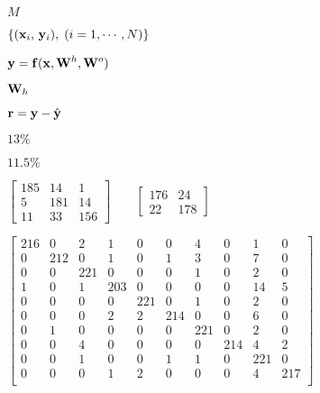 \documentclass{article}
\def\lthtmlcheckvsize{\ifdim\ht\sizebox<\vsize 
  \ifdim\wd\sizebox<\hsize\expandafter\hfill\fi \expandafter\vfill
  \else\expandafter\vss\fi}%
\begin{document}
{\newpage\clearpage
{}%
$ M$%
\lthtmlindisplaymathZ
\lthtmlcheckvsize\clearpage}

{\newpage\clearpage
{}%
$ \{({\bf x}_i,\,{\bf y}_i),\;(i=1,\cdots,N)\}$%
\lthtmlindisplaymathZ
\lthtmlcheckvsize\clearpage}

{\newpage\clearpage
{}%
$\displaystyle {\bf y}={\bf f}({\bf x},{\bf W}^h,{\bf W}^o)$%
\lthtmlindisplaymathZ
\lthtmlcheckvsize\clearpage}

{\newpage\clearpage
{}%
$ {\bf W}_h$%
\lthtmlindisplaymathZ
\lthtmlcheckvsize\clearpage}

{\newpage\clearpage
{}%
$ {\bf r}={\bf y}-\hat{\bf y}$%
\lthtmlindisplaymathZ
\lthtmlcheckvsize\clearpage}

{\newpage\clearpage
{}%
$ 13\%$%
\lthtmlindisplaymathZ
\lthtmlcheckvsize\clearpage}

{\newpage\clearpage
{}%
$ 11.5\%$%
\lthtmlindisplaymathZ
\lthtmlcheckvsize\clearpage}

{\newpage\clearpage
{}%
$\displaystyle \left[ \begin{array}{rrr}
185 & 14 &  1 \\5 & 181 & 14 \\11 & 33 &156
\end{array}\right]
\;\;\;\;\;\;\;
\left[ \begin{array}{rr}176 & 24 \\22 & 178 \end{array}\right]$%
\lthtmlindisplaymathZ
\lthtmlcheckvsize\clearpage}

{\newpage\clearpage
{}%
$\displaystyle \left[ \begin{array}{rrrrrrrrrr}
216 & 0 & 2 & 1 & 0 & 0 & 4 & 0 & 1 &  0 \\
0 & 212 & 0 & 1 & 0 & 1 & 3 & 0 & 7 & 0 \\
0 & 0 & 221 & 0 & 0 & 0 & 1 & 0 & 2 & 0 \\
1 & 0 & 1 & 203 & 0 & 0 & 0 & 0 & 14& 5 \\
0 & 0 & 0 & 0 & 221 & 0 & 1 & 0 & 2 & 0 \\
0 & 0 & 0 & 2 & 2 & 214 & 0 & 0 & 6 & 0 \\
0 & 1 & 0 & 0 & 0 & 0 & 221 & 0 & 2 & 0 \\
0 & 0 & 4 & 0 & 0 & 0 & 0 & 214 & 4 & 2 \\
0 & 0 & 1 & 0 & 0 & 1 & 1 & 0 & 221 & 0 \\
0 & 0 & 0 & 1 & 2 & 0 & 0 & 0 & 4 & 217 \\
\end{array}\right]$%
\lthtmlindisplaymathZ
\lthtmlcheckvsize\clearpage}
\end{document}
